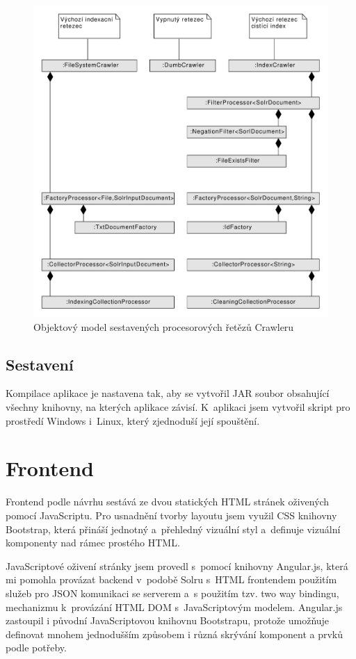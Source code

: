 \begin{figure}[h]
\begin{center}
\includegraphics[width=13cm]{ProcessorChain}
\caption{Objektový model sestavených procesorových řetězů Crawleru}
\label{fig:ProcessorChain}
\end{center}
\end{figure}


\subsection{Sestavení}
Kompilace aplikace je nastavena tak, aby se vytvořil JAR soubor obsahující všechny knihovny, na kterých aplikace závisí. K~aplikaci jsem vytvořil skript pro prostředí Windows i~Linux, který zjednoduší její spouštění.

\section{Frontend}
Frontend podle návrhu sestává ze dvou statických HTML stránek oživených pomocí JavaScriptu. Pro usnadnění tvorby layoutu jsem využil CSS knihovny Bootstrap\cite{bootstrap}, která přináší jednotný a~přehledný vizuální styl a~definuje vizuální komponenty nad rámec prostého HTML.

JavaScriptové oživení stránky jsem provedl s~pomocí knihovny Angular.js\cite{angular}, která mi pomohla provázat backend v~podobě Solru s~HTML frontendem použitím služeb pro JSON komunikaci se serverem a~s použitím tzv. two way bindingu, mechanizmu k~provázání HTML DOM s~JavaScriptovým modelem. Angular.js zastoupil i původní JavaScriptovou knihovnu Bootstrapu, protože umožňuje definovat mnohem jednodušším způsobem i různá skrývání komponent a prvků podle potřeby.

